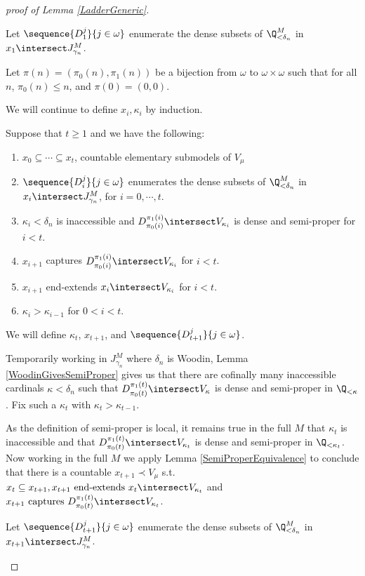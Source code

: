 \documentclass[oneside,12pt]{amsart}
\begin{document}
\begin{proof}[proof of Lemma  \ref{LadderGeneric}]
\begin{subproof}
Let $\sequence{D_1^j}{j\in\omega}$ enumerate the dense subsets of $\Q_{<\delta_n}^M$ in $x_1\intersect J^M_{\gamma_n}$.

Let $\pi(n) = (\pi_0(n),\pi_1(n))$ be a bijection from $\omega$ to $\omega \times \omega$ such that for all $n$, $\pi_0(n)\leq n$,
and $\pi(0)=(0,0)$.

We will continue to define $x_i, \kappa_i$ by induction.

Suppose that $t\geq 1$ and we have the following:
\begin{enumerate}
\item $x_0 \subseteq \cdots \subseteq x_t$, countable elementary submodels of $V_{\mu}$
\item $\sequence{D_i^j}{j\in\omega}$ enumerates the dense subsets of $\Q_{<\delta_n}^M$ in $x_i\intersect J^M_{\gamma_n}$, for $i=0,\cdots,t$.
\item $\kappa_i < \delta_n$ is inaccessible and $D_{\pi_0(i)}^{\pi_1(i)} \intersect V_{\kappa_i}$ is dense and semi-proper for $i < t$.
\item $x_{i+1}$ captures $D_{\pi_0(i)}^{\pi_1(i)}\intersect V_{\kappa_i}$ for $i < t$.
\item $x_{i+1}$ end-extends $x_i \intersect V_{\kappa_i}$ for $i<t$.
\item $\kappa_i > \kappa_{i-1}$ for $0<i<t$.
\end{enumerate}

We will define $\kappa_t$, $x_{t+1}$, and $\sequence{D_{t+1}^j}{j\in\omega}$.

Temporarily working in $J^M_{\gamma_n}$ where $\delta_n$
is Woodin, Lemma \ref{WoodinGivesSemiProper} gives us that there are cofinally many inaccessible cardinals
$\kappa<\delta_n$ such
that $D_{\pi_0(t)}^{\pi_1(t)}\intersect V_{\kappa}$ is dense and semi-proper in $\Q_{<\kappa}$.
Fix such a $\kappa_t$ with $\kappa_t > \kappa_{t-1}$.

As the definition of semi-proper is local, it remains true in the full $M$ that
$\kappa_t$ is inaccessible and that $D_{\pi_0(t)}^{\pi_1(t)}\intersect V_{\kappa_t}$ is dense and semi-proper in $\Q_{<\kappa_t}$.
Now working in the full $M$ we apply Lemma \ref{SemiProperEquivalence} to conclude that there is a countable 
$x_{t+1} \prec V_{\mu}$
s.t.  $x_t\subseteq x_{t+1}, x_{t+1} \text{ end-extends } x_t \intersect V_{\kappa_t}$ and $x_{t+1} \text{ captures } D_{\pi_0(t)}^{\pi_1(t)} \intersect V_{\kappa_t}$.

Let $\sequence{D_{t+1}^j}{j\in\omega}$ enumerate the dense subsets of $\Q_{<\delta_n}^M$ in $x_{t+1}\intersect J^M_{\gamma_n}$.


\end{subproof}
\end{proof}
\end{document}
